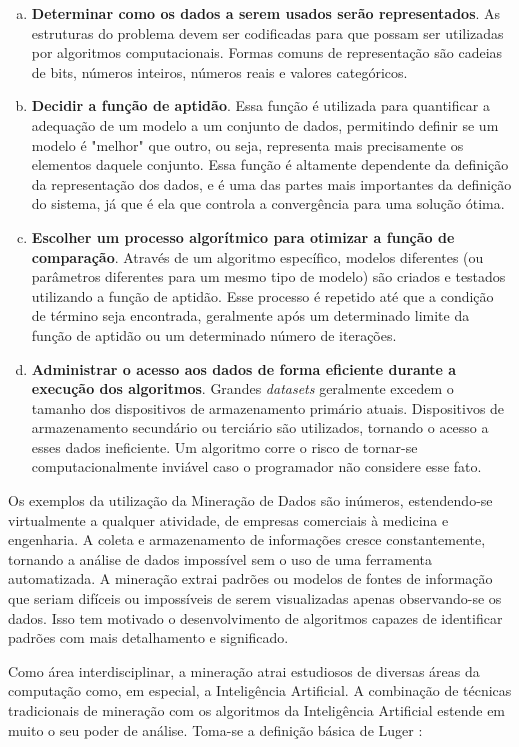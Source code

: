 \begin{enumerate}[a)]
    \item \textbf{Determinar como os dados a serem usados serão representados}. As estruturas do problema devem ser codificadas para que possam ser utilizadas por algoritmos computacionais. Formas comuns de representação são cadeias de bits, números inteiros, números reais e valores categóricos.
    \item \textbf{Decidir a função de aptidão}. Essa função é utilizada para quantificar a adequação de um modelo a um conjunto de dados, permitindo definir se um modelo é "melhor" que outro, ou seja, representa mais precisamente os elementos daquele conjunto. Essa função é altamente dependente da definição da representação dos dados, e é uma das partes mais importantes da definição do sistema, já que é ela que controla a convergência para uma solução ótima.
    \item \textbf{Escolher um processo algorítmico para otimizar a função de comparação}. Através de um algoritmo específico, modelos diferentes (ou parâmetros diferentes para um mesmo tipo de modelo) são criados e testados utilizando a função de aptidão. Esse processo é repetido até que a condição de término seja encontrada, geralmente após um determinado limite da função de aptidão ou um determinado número de iterações.
    \item \textbf{Administrar o acesso aos dados de forma eficiente durante a execução dos algoritmos}. Grandes \emph{datasets} geralmente excedem o tamanho dos dispositivos de armazenamento primário atuais. Dispositivos de armazenamento secundário ou terciário são utilizados, tornando o acesso a esses dados ineficiente. Um algoritmo corre o risco de tornar-se computacionalmente inviável caso o programador não considere esse fato.
\end{enumerate}

Os exemplos da utilização da Mineração de Dados são inúmeros, estendendo-se virtualmente a qualquer atividade, de empresas comerciais à medicina e engenharia. A coleta e armazenamento de informações cresce constantemente, tornando a análise de dados impossível sem o uso de uma ferramenta automatizada. A mineração extrai padrões ou modelos de fontes de informação que seriam difíceis ou impossíveis de serem visualizadas apenas observando-se os dados. Isso tem motivado o desenvolvimento de algoritmos capazes de identificar padrões com mais detalhamento e significado.

Como área interdisciplinar, a mineração atrai estudiosos de diversas áreas da computação como, em especial, a Inteligência Artificial. A combinação de técnicas tradicionais de mineração com os algoritmos da Inteligência Artificial estende em muito o seu poder de análise. Toma-se a definição básica de Luger \cite[p. 1]{Luger2009}:

